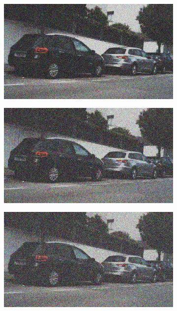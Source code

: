 \documentclass[a4paper]{ctexart}
\begin{document}
\begin{figure}[htbp]
\begin{subfigure}{0.08\textwidth}
			\label{fig：Gamma=0.3, Gauss Noise = 0.4}
		\end{subfigure}
		\begin{subfigure}{0.08\textwidth}
			\captionsetup{font=scriptsize}
			\includegraphics[width=\linewidth]{picture/Edge Detection/degrade/RGB_001 Gamma=0.3, Gauss Noise=0.5}
			\label{fig：Gamma=0.3, Gauss Noise = 0.5}
		\end{subfigure}
		\begin{subfigure}{0.08\textwidth}
			\captionsetup{font=scriptsize}
			\includegraphics[width=\linewidth]{picture/Edge Detection/degrade/RGB_001 Gamma=0.3, Gauss Noise=0.6}
			\label{fig：Gamma=0.3, Gauss Noise = 0.6}
		\end{subfigure}
		\begin{subfigure}{0.08\textwidth}
			\captionsetup{font=scriptsize}
			\includegraphics[width=\linewidth]{picture/Edge Detection/degrade/RGB_001 Gamma=0.3, Gauss Noise=0.7}

\end{subfigure}
\end{figure}
\end{document}
